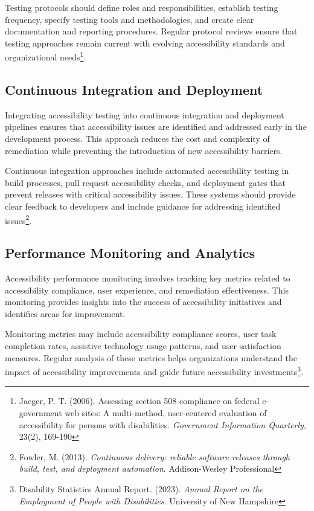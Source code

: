 Testing protocols should define roles and responsibilities, establish testing frequency, specify testing tools and methodologies, and create clear documentation and reporting procedures. Regular protocol reviews ensure that testing approaches remain current with evolving accessibility standards and organizational needs\footnote{Jaeger, P. T. (2006). Assessing section 508 compliance on federal e-government web sites: A multi-method, user-centered evaluation of accessibility for persons with disabilities. \textit{Government Information Quarterly}, 23(2), 169-190}.

\subsection{Continuous Integration and Deployment}

Integrating accessibility testing into continuous integration and deployment pipelines ensures that accessibility issues are identified and addressed early in the development process. This approach reduces the cost and complexity of remediation while preventing the introduction of new accessibility barriers.

Continuous integration approaches include automated accessibility testing in build processes, pull request accessibility checks, and deployment gates that prevent releases with critical accessibility issues. These systems should provide clear feedback to developers and include guidance for addressing identified issues\footnote{Fowler, M. (2013). \textit{Continuous delivery: reliable software releases through build, test, and deployment automation}. Addison-Wesley Professional}.

\subsection{Performance Monitoring and Analytics}

Accessibility performance monitoring involves tracking key metrics related to accessibility compliance, user experience, and remediation effectiveness. This monitoring provides insights into the success of accessibility initiatives and identifies areas for improvement.

Monitoring metrics may include accessibility compliance scores, user task completion rates, assistive technology usage patterns, and user satisfaction measures. Regular analysis of these metrics helps organizations understand the impact of accessibility improvements and guide future accessibility investments\footnote{Disability Statistics Annual Report. (2023). \textit{Annual Report on the Employment of People with Disabilities}. University of New Hampshire}.

